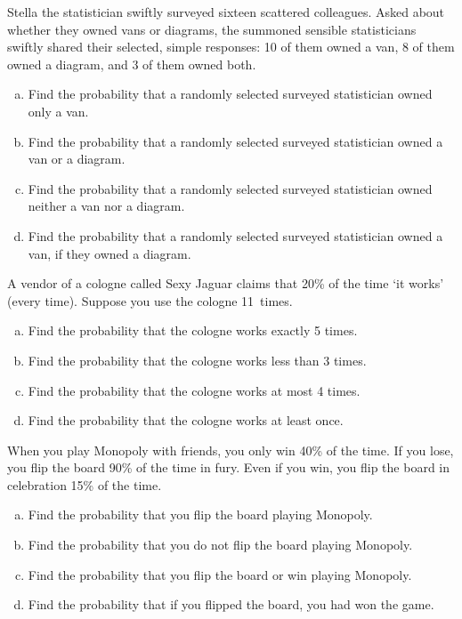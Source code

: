 \documentclass[12pt,letterpaper]{exam}
\begin{document}
\begin{questions}
\newpage
\question[15] Stella the statistician swiftly surveyed sixteen scattered colleagues. Asked about whether they owned vans or diagrams, the summoned sensible statisticians swiftly shared their selected, simple responses: 10 of them owned a van, 8 of them owned a diagram, and 3 of them owned both. 
	\begin{enumerate}[(a)]
	\item Find the probability that a randomly selected surveyed statistician owned only a van. 
	\item Find the probability that a randomly selected surveyed statistician owned a van or a diagram. 
	\item Find the probability that a randomly selected surveyed statistician owned neither a van nor a diagram.
	\item Find the probability that a randomly selected surveyed statistician owned a van, if they owned a diagram. 
	\end{enumerate}



\newpage
\question[15] A vendor of a cologne called Sexy Jaguar claims that 20\% of the time `it works' (every time). Suppose you use the cologne 11~times. 
	\begin{enumerate}[(a)]
	\item Find the probability that the cologne works exactly 5 times. 
	\item Find the probability that the cologne works less than 3 times.
	\item Find the probability that the cologne works at most 4 times.
	\item Find the probability that the cologne works at least once. 
	\end{enumerate}



\newpage
\question[15] When you play Monopoly with friends, you only win 40\% of the time. If you lose, you flip the board 90\% of the time in fury. Even if you win, you flip the board in celebration 15\% of the time.
	\begin{enumerate}[(a)]
	\item Find the probability that you flip the board playing Monopoly. 
	\item Find the probability that you do not flip the board playing Monopoly. 
	\item Find the probability that you flip the board or win playing Monopoly. 
	\item Find the probability that if you flipped the board, you had won the game. 
	\end{enumerate}


\end{questions}
\end{document}
